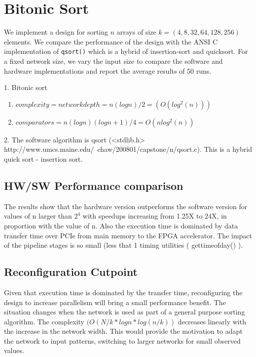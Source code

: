 \section{Bitonic Sort}

We implement a design for sorting $n$ arrays of size $k = (4, 8, 32,
64, 128, 256)$ elements. We compare the performance of the design with
the ANSI C implementation of \texttt{qsort()} which is a hybrid of
insertion-sort and quicksort. For a fixed network size, we vary the
input size to compare the software and hardware implementations and
report the average results of 50 runs.



1. Bitonic sort
\begin{enumerate}
\item $complexity = network depth = n(logn)/2 =  (O(log^2(n)))  $
\item $ comparators = n (logn) (logn + 1) / 4 = O(nlog^2(n)) $
\end{enumerate}


2. The software algorithm is qsort (<stdlib.h>
http://www.umcs.maine.edu/~chaw/200801/capstone/n/qsort.c). This is a
hybrid quick sort - insertion sort.


\subsection{HW/SW Performance comparison}

The results show that the hardware version outperforms the software
version for values of n larger than $2^4$ with speedups increasing from
1.25X to 24X, in proportion with the value of n.  Also the execution
time is dominated by data transfer time over PCIe from main memory to
the FPGA accelerator. The impact of the pipeline stages is so small
(less that 1%
timing utilities ( gettimeofday() ).

\subsection{Reconfiguration Cutpoint}

Given that execution time is dominated by the transfer time,
reconfiguring the design to increase parallelism will bring a small
performance benefit.  The situation changes when the network is used
as part of a general purpose sorting algorithm. The complexity $( O(N/k
* logn * log(n/k)) $ decreases linearly with the increase in the network
width. This would provide the motivation to adapt the network to input
patterns, switching to larger networks for small observed values.

